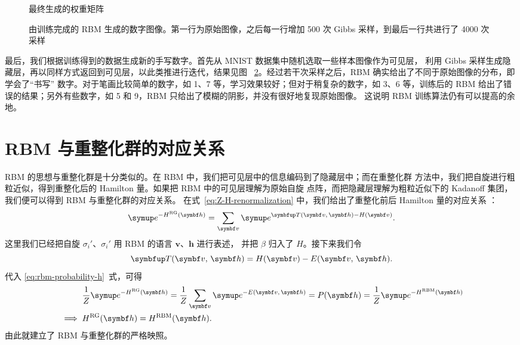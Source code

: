\begin{figure}[!htb]
  \centering
  \caption{最终生成的权重矩阵}
  \label{fig:mnist-weight}
\end{figure}

\begin{figure}[!htb]
  \centering
  \caption{由训练完成的 RBM 生成的数字图像。第一行为原始图像，之后每一行增加 \num{500} 次 Gibbs
    采样，到最后一行共进行了 \num{4000} 次采样}
  \label{fig:mnist-samples}
\end{figure}

最后，我们根据训练得到的数据生成新的手写数字。首先从 MNIST 数据集中随机选取一些样本图像作为可见层，
利用 Gibbs 采样生成隐藏层，再以同样方式返回到可见层，以此类推进行迭代，结果见图~%
\ref{fig:mnist-samples}。经过若干次采样之后，RBM 确实给出了不同于原始图像的分布，即学会了“书写”
数字。对于笔画比较简单的数字，如 1、7 等，学习效果较好；但对于稍复杂的数字，如 3、6 等，训练后的
RBM 给出了错误的结果；另外有些数字，如 5 和 9，RBM 只给出了模糊的阴影，并没有很好地复现原始图像。
这说明 RBM 训练算法仍有可以提高的余地。

\section{RBM 与重整化群的对应关系}

RBM 的思想与重整化群是十分类似的。在 RBM 中，我们把可见层中的信息编码到了隐藏层中；而在重整化群
方法中，我们把自旋进行粗粒近似，得到重整化后的 Hamilton 量。如果把 RBM 中的可见层理解为原始自旋
点阵，而把隐藏层理解为粗粒近似下的 Kadanoff 集团，我们便可以得到 RBM 与重整化群的对应关系。
在式~\eqref{eq:Z-H-renormalization} 中，我们给出了重整化前后 Hamilton 量的对应关系 \cite{exact}：
\begin{equation}
    \ee^{-H^{\text{RG}}(\bm{h})}
  = \sum_{\bm{v}} \ee^{\opT(\bm{v},\,\bm{h})-H(\bm{v})}.
\end{equation}
这里我们已经把自旋 $\sigma_i'$、$\sigma_i'$ 用 RBM 的语言 $\bm{v}$、$\bm{h}$ 进行表述，
并把 $\beta$ 归入了 $H$。接下来我们令
\begin{equation}
  \opT(\bm{v},\,\bm{h}) = H(\bm{v}) - E(\bm{v},\,\bm{h}).
\end{equation}
代入 \eqref{eq:rbm-probability-h}~式，可得
\begin{align}
  &\mathrel{\phantom{\implies}}
    \frac{1}{Z} \ee^{-H^{\text{RG}}(\bm{h})}
  = \frac{1}{Z} \sum_{\bm{v}} \ee^{-E(\bm{v},\,\bm{h})}
  = P(\bm{h})
  = \frac{1}{Z} \ee^{-H^{\text{RBM}}(\bm{h})} \notag \\
  &\implies H^{\text{RG}}(\bm{h}) = H^{\text{RBM}}(\bm{h}).
\end{align}
由此就建立了 RBM 与重整化群的严格映照。

